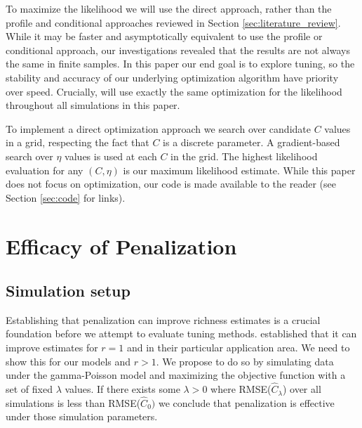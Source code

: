 \documentclass[oupdraft]{bio}
\begin{document}
To maximize the likelihood we will use the direct approach, rather than the profile and conditional approaches reviewed in Section \ref{sec:literature_review}.  While it may be faster and asymptotically equivalent to use the profile or conditional approach, our investigations revealed that the results are not always the same in finite samples.  In this paper our end goal is to explore tuning, so the stability and accuracy of our underlying optimization algorithm have priority over speed.  Crucially, will use exactly the same optimization for the likelihood throughout all simulations in this paper.

To implement a direct optimization approach we search over candidate $C$ values in a grid, respecting the fact that $C$ is a discrete parameter.  A gradient-based search over $\eta$ values is used at each $C$ in the grid.  The highest likelihood evaluation for any $(C, \eta)$ is our maximum likelihood estimate.  While this paper does not focus on optimization, our code is made available to the reader (see Section \ref{sec:code} for links).

\section{Efficacy of Penalization}
\label{sec:efficacy_sims}
\subsection{Simulation setup}

Establishing that penalization can improve richness estimates is a crucial foundation before we attempt to evaluate tuning methods.  \citet{wang_2005} established that it can improve estimates for $r = 1$ and in their particular application area.  We need to show this for our models and $r > 1$.  We propose to do so by simulating data under the gamma-Poisson model and maximizing the objective function with a set of fixed $\lambda$ values.  If there exists some $\lambda > 0$ where RMSE($\widehat{C}_{\lambda}$) over all simulations is less than RMSE($\widehat{C}_0)$ we conclude that penalization is effective under those simulation parameters.
\end{document}
